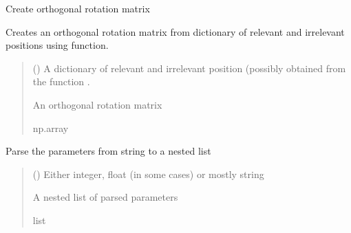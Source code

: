 \documentclass[letterpaper,10pt,english]{sphinxmanual}
\begin{document}
\begin{fulllineitems}
\label{\detokenize{Utilities:pysimrel.utilities.get_rotation}}
\pysigstartsignatures
{}
\pysigstopsignatures
\sphinxAtStartPar
Create orthogonal rotation matrix

\sphinxAtStartPar
Creates an orthogonal rotation matrix from dictionary of relevant and irrelevant
positions using  function.
\begin{quote}\begin{description}
\sphinxAtStartPar
{} () \textendash{} A dictionary of relevant and irrelevant position (possibly obtained from the function .

\sphinxAtStartPar
An orthogonal rotation matrix

\sphinxAtStartPar
np.array

\end{description}\end{quote}

\end{fulllineitems}


\begin{fulllineitems}
\label{\detokenize{Utilities:pysimrel.utilities.parse_param}}
\pysigstartsignatures
{}
\pysigstopsignatures
\sphinxAtStartPar
Parse the parameters from string to a nested list
\begin{quote}\begin{description}
\sphinxAtStartPar
{} (\sphinxstyleliteralemphasis{\sphinxupquote{, }}) \textendash{} Either integer, float (in some cases) or mostly string

\sphinxAtStartPar
A nested list of parsed parameters

\sphinxAtStartPar
list

\end{description}\end{quote}

\end{fulllineitems}
\end{document}
